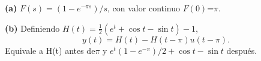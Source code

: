 \noindent\textbf{(a)} \(F(s)=(1-e^{-\pi s})/s\), con valor continuo \(F(0)\)=\ensuremath{\pi}.

\noindent\textbf{(b)} Definiendo \(H(t)=\tfrac12(e^t+\cos t-\sin t)-1\),
\[y(t)=H(t)-H(t-\pi)u(t-\pi).\]
Equivale a H(t) antes de\ensuremath{\pi} y \(e^t(1-e^{-\pi})/2+\cos t-\sin t\) después.
